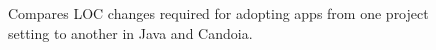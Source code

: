 \begin{figure}
\begin{adjustbox}{max width=\textwidth}
\begin{tabular}{|c|c|l|l|l|l|l|l|c|c|c|c|c|}
\end{tabular}
\end{adjustbox}
\caption{\tiny{Compares LOC changes required for adopting apps from one project
setting to another in Java and Candoia.}}
\label{fig:adoptability}
\end{figure}